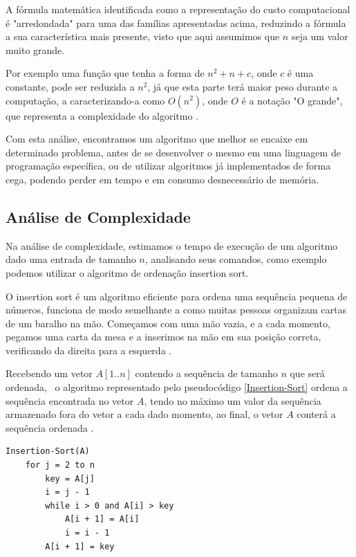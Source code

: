 \documentclass[
    12pt,               %
    openright,          %
    oneside,            %
    a4paper,            %
    english,            %
    brazil              %
    ]{abntex2}
\begin{document}
A fórmula matemática identificada como a representação do custo computacional é "arredondada" para uma das famílias
apresentadas acima, reduzindo a fórmula a sua característica mais presente, visto que aqui assumimos que $n$ seja
um valor muito grande. 

Por exemplo uma função que tenha a forma de $n^2 + n + c$, onde $c$ é uma constante, pode ser reduzida a $n^2$, 
já que esta parte terá maior peso durante a computação, a caracterizando-a como $O(n^2)$, onde $O$ é a notação 
"O grande", que representa a complexidade do algoritmo \cite{introductionAlgorthms}.

Com esta análise, encontramos um algoritmo que melhor se encaixe em determinado problema, antes de se
desenvolver o mesmo em uma linguagem de programação específica, ou de utilizar algoritmos já implementados de forma
cega, podendo perder em tempo e em consumo desnecessário de memória.

\subsection{Análise de Complexidade}

Na análise de complexidade, estimamos o tempo de execução de um algoritmo dado uma entrada de tamanho $n$, analisando 
seus comandos, como exemplo podemos utilizar o algoritmo de ordenação insertion sort. 

O insertion sort é um algoritmo eficiente para ordena uma sequência pequena de números, funciona de modo semelhante a
como muitas pessoas organizam cartas de um baralho na mão. Começamos com uma mão vazia, e a cada momento, pegamos uma
carta da mesa e a inserimos na mão em sua posição correta, verificando da direita para a esquerda \cite{introductionAlgorthms}.

Recebendo um vetor $A[1..n]$ contendo a sequência de tamanho $n$ que será ordenada,  o algoritmo representado pelo
pseudocódigo \ref{Insertion-Sort} ordena a sequência encontrada no vetor $A$, tendo no máximo um valor da sequência 
armazenado fora do vetor a cada dado momento, ao final, o vetor $A$ conterá a sequência ordenada \cite{introductionAlgorthms}.

\lstset{style=psceudo}
\begin{lstlisting}[caption={\label{Insertion-Sort}Insertion-Sort}]
    Insertion-Sort(A)
    for j = 2 to n
        key = A[j]
        i = j - 1
        while i > 0 and A[i] > key
            A[i + 1] = A[i]
            i = i - 1
        A[i + 1] = key  
\end{lstlisting}
\end{document}
